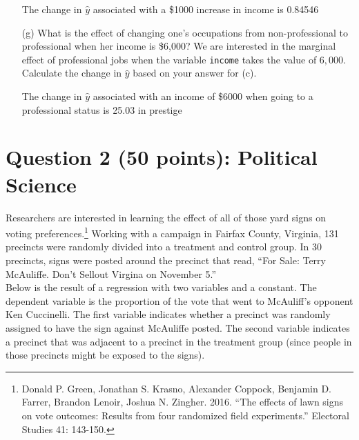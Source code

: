 \documentclass[12pt,letterpaper]{article}
\begin{document}
\begin{enumerate}
	The change in $\hat{y}$ associated with a \$1000 increase in income is 0.84546
	\vspace{4cm}
	
	
	\item [(g)]
	What is the effect of changing one's occupations from non-professional to professional when her income is \$6,000? We are interested in the marginal effect of professional jobs when the variable \texttt{income} takes the value of $6,000$. Calculate the change in $\hat{y}$ based on your answer for (c).
	
	\vspace{.5cm}
	
	The change in $\hat{y}$ associated with an income of \$6000 when going to a professional status is 25.03 in prestige
	
\end{enumerate}

\newpage

\section*{Question 2 (50 points): Political Science}
\vspace{.25cm}
\noindent 	Researchers are interested in learning the effect of all of those yard signs on voting preferences.\footnote{Donald P. Green, Jonathan	S. Krasno, Alexander Coppock, Benjamin D. Farrer,	Brandon Lenoir, Joshua N. Zingher. 2016. ``The effects of lawn signs on vote outcomes: Results from four randomized field experiments.'' Electoral Studies 41: 143-150. } Working with a campaign in Fairfax County, Virginia, 131 precincts were randomly divided into a treatment and control group. In 30 precincts, signs were posted around the precinct that read, ``For Sale: Terry McAuliffe. Don't Sellout Virgina on November 5.'' \\

Below is the result of a regression with two variables and a constant.  The dependent variable is the proportion of the vote that went to McAuliff's opponent Ken Cuccinelli. The first variable indicates whether a precinct was randomly assigned to have the sign against McAuliffe posted. The second variable indicates
a precinct that was adjacent to a precinct in the treatment group (since people in those precincts might be exposed to the signs).  \\
\end{document}
